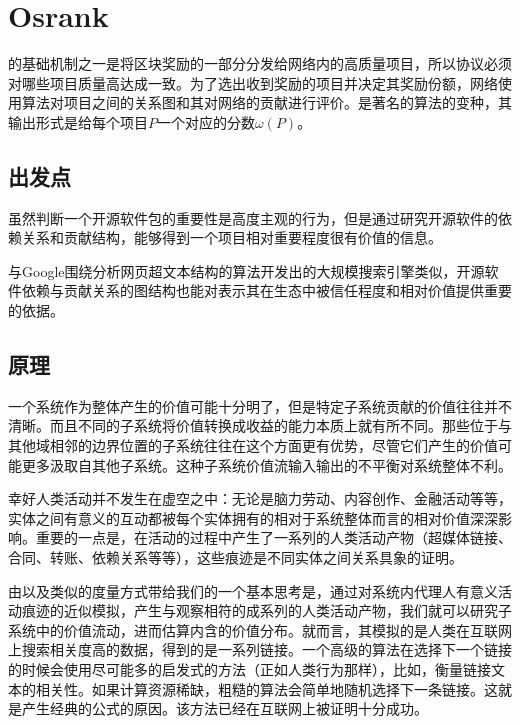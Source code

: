 \section{Osrank}
\label{s:osrank}

\def\Graph{\mathsf{Graph}}
\def\proj{\mathsf{project}}
\def\contributor{\mathsf{account}}
\def\dep{\mathsf{depend}}
\def\own{\mathsf{maintain}}
\def\coown{\mathsf{maintain}^\circ}
\def\contrib{\mathsf{contrib}}
\def\cocontrib{\mathsf{contrib}^\circ}

\oscoin{}的基础机制之一是将区块奖励的一部分分发给网络内的高质量项目，所以\oscoin{}协议必须对哪些项目质量高达成一致。为了选出收到\oscoin{}奖励的项目并决定其奖励份额，\oscoin{}网络使用\osrank{}算法对项目之间的关系图和其对网络的贡献进行评价。\osrank{}是著名的\pagerank{}算法的变种，其输出形式是给每个项目$P$一个对应的分数$\omega(P)$。

\subsection{出发点}

虽然判断一个开源软件包的重要性是高度主观的行为，但是通过研究开源软件的依赖关系和贡献结构，能够得到一个项目相对重要程度很有价值的信息。

与Google围绕分析网页超文本结构的\pagerank{}算法开发出的大规模搜索引擎类似，开源软件依赖与贡献关系的图结构也能对表示其在生态中被信任程度和相对价值提供重要的依据。

\subsection{原理}

一个系统作为整体产生的价值可能十分明了，但是特定子系统贡献的价值往往并不清晰。而且不同的子系统将价值转换成收益的能力本质上就有所不同。那些位于与其他域相邻的边界位置的子系统往往在这个方面更有优势，尽管它们产生的价值可能更多汲取自其他子系统。这种子系统价值流输入输出的不平衡对系统整体不利。

幸好人类活动并不发生在虚空之中：无论是脑力劳动、内容创作、金融活动等等，实体之间有意义的互动都被每个实体拥有的相对于系统整体而言的相对价值深深影响。重要的一点是，在活动的过程中产生了一系列的人类活动产物（超媒体链接、合同、转账、依赖关系等等），这些痕迹是不同实体之间关系具象的证明。

由\pagerank{}以及类似的度量方式带给我们的一个基本思考是，通过对系统内代理人有意义活动痕迹的近似模拟，产生与观察相符的成系列的人类活动产物，我们就可以研究子系统中的价值流动，进而估算内含的价值分布。就\pagerank{}而言，其模拟的是人类在互联网上搜索相关度高的数据，得到的是一系列链接。一个高级的算法在选择下一个链接的时候会使用尽可能多的启发式的方法（正如人类行为那样），比如，衡量链接文本的相关性。如果计算资源稀缺，粗糙的算法会简单地随机选择下一条链接。这就是产生经典的\pagerank{}公式的原因。该方法已经在互联网上被证明十分成功。

